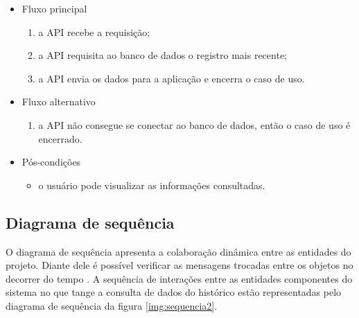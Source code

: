 \begin{itemize}
\begin{itemize}
			\item Fluxo principal
   	 			\begin{enumerate}
		     	   \item a API recebe a requisição;
			        \item a API requisita ao banco de dados o registro mais recente;
		    	    \item a API envia os dados para a aplicação e encerra o caso de uso.
		   		 \end{enumerate}

			\item Fluxo alternativo
		    	\begin{enumerate}
			        \item a API não consegue se conectar ao banco de dados, então o caso de uso é encerrado.
		    	\end{enumerate}
    				    	
		    \item Pós-condições
			    \begin{itemize}
        			\item o usuário pode visualizar as informações consultadas.
		    	\end{itemize}
		\end{itemize}
\end{itemize}


\subsection{Diagrama de sequência} \label{subsec:diagSeq}

O diagrama de sequência apresenta a colaboração dinâmica entre as entidades do projeto. Diante dele é possível verificar as mensagens trocadas entre os objetos no decorrer do tempo \cite{SITESEQ}. A sequência de interações entre as entidades componentes do sistema no que tange a consulta de dados do histórico estão representadas pelo diagrama de sequência da figura \ref{img:sequencia2}.

\newpage



